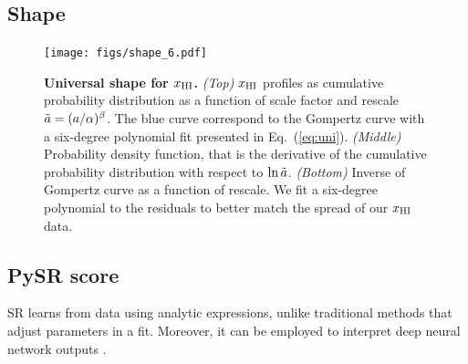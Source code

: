 \subsection*{Shape}
\label{ssec:shape}


\begin{figure}
\centering
\texttt{[image: figs/shape\_6.pdf]}
\caption{\textbf{Universal shape for $x_{\mathrm{HI}}$.}
\emph{(Top)} $x_{\mathrm{HI}}$ profiles as cumulative probability distribution as
a function of scale factor and rescale $\tilde{a} = (a/\alpha)^\beta$.
The blue curve correspond to the Gompertz curve with a six-degree
polynomial fit presented in Eq.~(\ref{eq:uni}).
\emph{(Middle)} Probability density function, that is the derivative of
the cumulative probability distribution with respect to $\ln\tilde{a}$.
\emph{(Bottom)} Inverse of Gompertz curve as a function of rescale.
We fit a six-degree polynomial to the residuals to better match the
spread of our $x_{\mathrm{HI}}$ data.}
\label{fig:shape}
\end{figure}


\subsection*{PySR score}
\label{ssec:pysr}

SR learns from data using analytic expressions, unlike traditional
methods that adjust parameters in a fit.
Moreover, it can be employed to interpret deep neural network outputs
\cite{Cranmer2020b}.



